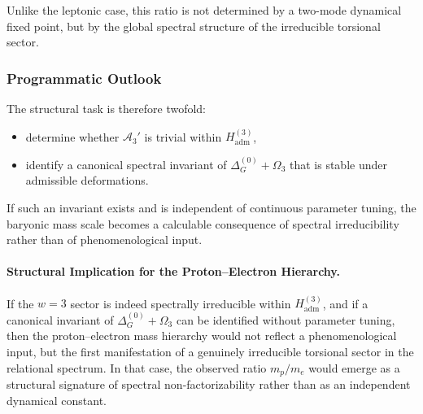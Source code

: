     Unlike the leptonic case,
    this ratio is not determined by a two-mode dynamical fixed point,
    but by the global spectral structure of the irreducible torsional
    sector.

  \subsubsection*{Programmatic Outlook}

    The structural task is therefore twofold:

    \begin{itemize}
      \item[(i)] determine whether $\mathcal{A}_3'$ is trivial within
      $H_{\mathrm{adm}}^{(3)}$,
      \item[(ii)] identify a canonical spectral invariant of
      $\Delta^{(0)}_G+\Omega_3$ that is stable under admissible
      deformations.
    \end{itemize}

    If such an invariant exists and is independent of continuous parameter tuning,
    the baryonic mass scale becomes a calculable consequence of
    spectral irreducibility rather than of phenomenological input.

    \paragraph*{Structural Implication for the Proton--Electron Hierarchy.}

      If the $w=3$ sector is indeed spectrally irreducible within $H_{\mathrm{adm}}^{(3)}$,
      and if a canonical invariant of $\Delta^{(0)}_G+\Omega_3$ can be identified without parameter tuning,
      then the proton--electron mass hierarchy would not reflect a phenomenological input,
      but the first manifestation of a genuinely irreducible torsional sector in the relational spectrum.
      In that case, the observed ratio $m_p/m_e$ would emerge as a structural signature of spectral
      non-factorizability rather than as an independent dynamical constant.
